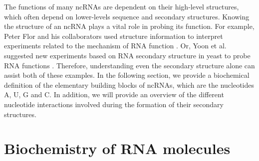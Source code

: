 The functions of many \acp{ncRNA} are dependent on their high-level structures, which often depend on lower-levels sequence and secondary structures. Knowing the structure of an \ac{ncRNA} plays a vital role in probing its function. For example, Peter Flor and his collaborators used structure information to interpret experiments related to the mechanism of \ac{RNA} function \cite{flor1989conserved}. Or, Yoon et al. suggested new experiments based on RNA secondary structure in yeast to probe RNA functions \cite{kim2007staufen1}. Therefore, understanding even the secondary structure alone can assist both of these examples. In the following section, we provide a biochemical definition of the elementary building blocks of \acp{ncRNA}, which are the nucleotides A, U, G and C. In addition, we will provide an overview of the different nucleotide interactions involved during the formation of their secondary structures. 

\section{Biochemistry of RNA molecules}
\label{sec:rna_biochemical}

